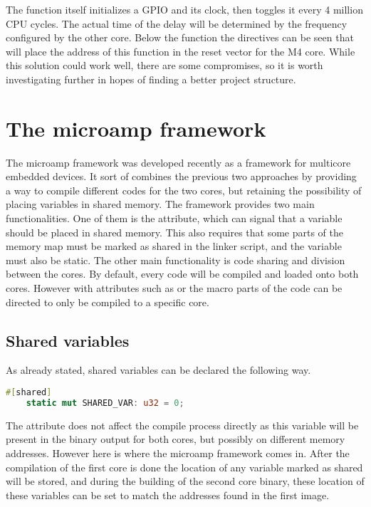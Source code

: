 The function itself initializes a GPIO and its clock, then toggles it every 4 million CPU cycles. The actual time of the delay will be determined by the frequency configured by the other core. Below the function the directives can be seen that will place the address of this function in the reset vector for the M4 core. While this solution could work well, there are some compromises, so it is worth investigating further in hopes of finding a better project structure.

\section{The microamp framework}

The microamp framework was developed recently as a framework for multicore embedded devices. It sort of combines the previous two approaches by providing a way to compile different codes for the two cores, but retaining the possibility of placing variables in shared memory. The framework provides two main functionalities. One of them is the \mycode{#[shared]} attribute, which can signal that a variable should be placed in shared memory. This also requires that some parts of the memory map must be marked as shared in the linker script, and the variable must also be static. The other main functionality is code sharing and division between the cores. By default, every code will be compiled and loaded onto both cores. However with attributes such as \mycode{#[cfg(core = "0")]} or the  macro parts of the code can be directed to only be compiled to a specific core.

\subsection{Shared variables}

As already stated, shared variables can be declared the following way.

\begin{lstlisting}[language=Rust,frame=single,float=!ht,style=customrust,label={lst:shared-variable},caption={Shared Variable Example}]
    #[shared]
    static mut SHARED_VAR: u32 = 0;
\end{lstlisting}

The attribute does not affect the compile process directly as this variable will be present in the binary output for both cores, but possibly on different memory addresses. However here is where the microamp framework comes in. After the compilation of the first core is done the location of any variable marked as shared will be stored, and during the building of the second core binary, these location of these variables can be set to match the addresses found in the first image.

